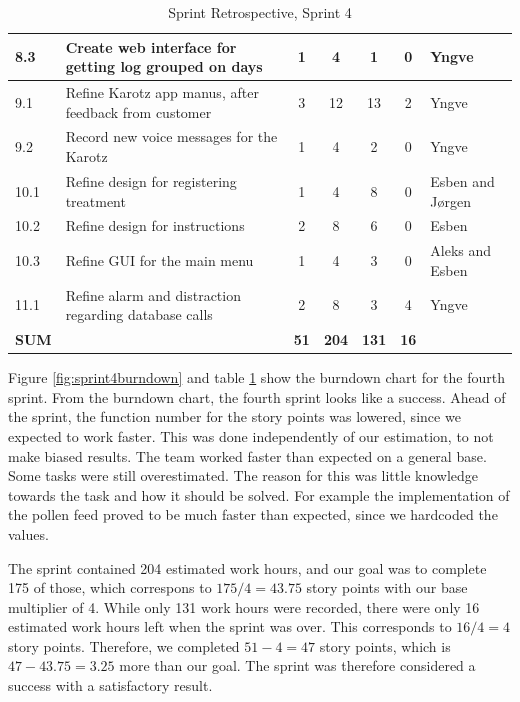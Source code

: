 \begin{table}
\begin{center}
\begin{sideways}
\begin{tabular}{|l | p{7.5cm} | c | c | c | c | l |}
 			\hline
 			8.3 & Create web interface for getting log grouped on days & 1 & 4 & 1 & 0 & Yngve \\
 			\hline
 			9.1 & Refine Karotz app manus, after feedback from customer & 3 & 12 & 13 & 2 & Yngve \\
 			\hline
 			9.2 & Record new voice messages for the Karotz & 1 & 4 & 2 & 0 & Yngve \\
 			\hline
 			10.1 & Refine design for registering treatment & 1 & 4 & 8 & 0 & Esben and J\o rgen \\
 			\hline
 			10.2 & Refine design for instructions & 2 & 8 & 6 & 0 & Esben \\
 			\hline
 			10.3 & Refine GUI for the main menu & 1 & 4 & 3 & 0 & Aleks and Esben \\
 			\hline
 			11.1 & Refine alarm and distraction regarding database calls & 2 & 8 & 3 & 4 & Yngve \\
 			\hline 
 			\bfseries{SUM} & & \bfseries{51} & \bfseries{204} & \bfseries{131} & \bfseries{16} & \\
 			\hline
 		\end{tabular}
 	\end{sideways}
 	\caption{Sprint Retrospective, Sprint 4}
 	\label{tab:sprint4burndown}
 	\end{center}
\end{table}

Figure \ref{fig:sprint4burndown} and table \ref{tab:sprint4burndown} show the burndown chart for the fourth 
sprint. From the burndown chart, the fourth sprint looks like a success. Ahead of the 
sprint, the function number for the story points was lowered, since we expected to work faster. 
This was done independently of our estimation, to not make biased results. The team worked faster 
than expected on a general base. Some tasks were still overestimated. The reason for this was 
little knowledge towards the task and how it should be solved. For example the implementation of the 
pollen feed proved to be much faster than expected, since we hardcoded the values. 

The sprint contained 204 estimated work hours, and our goal was to complete 175 of those, which correspons
to $175/4=43.75$ story points with our base multiplier of 4. While only 131 work hours were recorded, there
were only 16 estimated work hours left when the sprint was over. This corresponds to $16/4=4$ story points.
Therefore, we completed $51-4=47$ story points, which is $47-43.75=3.25$ more than our goal. The sprint was 
therefore considered a success with a satisfactory result.